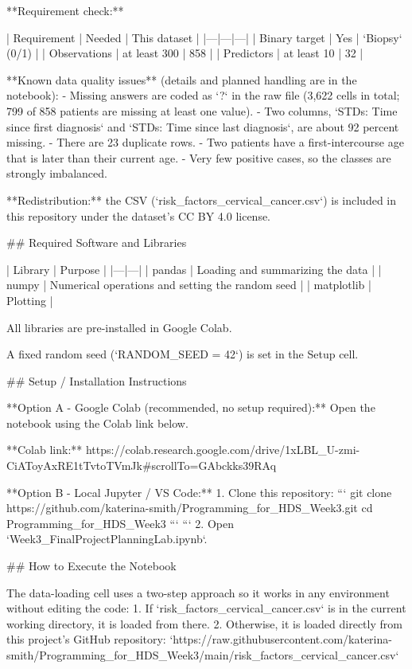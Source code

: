 **Requirement check:**

| Requirement | Needed | This dataset |
|---|---|---|
| Binary target | Yes | `Biopsy` (0/1) |
| Observations | at least 300 | 858 |
| Predictors | at least 10 | 32 |

**Known data quality issues** (details and planned handling are in the notebook):
- Missing answers are coded as `?` in the raw file (3,622 cells in total; 799 of 858
  patients are missing at least one value).
- Two columns, `STDs: Time since first diagnosis` and `STDs: Time since last diagnosis`,
  are about 92 percent missing.
- There are 23 duplicate rows.
- Two patients have a first-intercourse age that is later than their current age.
- Very few positive cases, so the classes are strongly imbalanced.

**Redistribution:** the CSV (`risk_factors_cervical_cancer.csv`) is included in this
repository under the dataset's CC BY 4.0 license.

## Required Software and Libraries

| Library | Purpose |
|---|---|
| pandas | Loading and summarizing the data |
| numpy | Numerical operations and setting the random seed |
| matplotlib | Plotting |

All libraries are pre-installed in Google Colab. 

A fixed random seed (`RANDOM_SEED = 42`) is set in the Setup cell. 

## Setup / Installation Instructions

**Option A - Google Colab (recommended, no setup required):**
Open the notebook using the Colab link below.

**Colab link:** https://colab.research.google.com/drive/1xLBL_U-zmi-CiAToyAxRE1tTvtoTVmJk#scrollTo=GAbckks39RAq

**Option B - Local Jupyter / VS Code:**
1. Clone this repository:
   ```
   git clone https://github.com/katerina-smith/Programming_for_HDS_Week3.git
   cd Programming_for_HDS_Week3
   ```
   ```
2. Open `Week3_FinalProjectPlanningLab.ipynb`.

## How to Execute the Notebook

The data-loading cell uses a two-step approach so it works in any environment without
editing the code:
1. If `risk_factors_cervical_cancer.csv` is in the current working directory, it is loaded
   from there.
2. Otherwise, it is loaded directly from this project's GitHub repository:
   `https://raw.githubusercontent.com/katerina-smith/Programming_for_HDS_Week3/main/risk_factors_cervical_cancer.csv`

